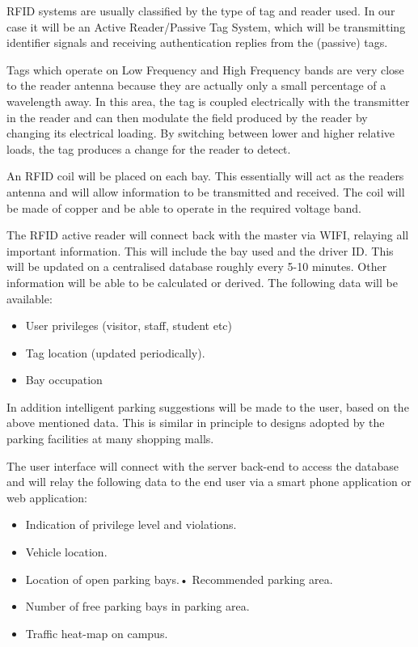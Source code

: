 RFID systems are usually classified by the type of tag and reader used. In our case it will be an Active
Reader/Passive Tag System, which will be transmitting identifier signals and receiving authentication
replies from the (passive) tags.

Tags which operate on Low Frequency and High Frequency bands are very close to the reader
antenna because they are actually only a small percentage of a wavelength away. In this area, the
tag is coupled electrically with the transmitter in the reader and can then modulate the field
produced by the reader by changing its electrical loading. By switching between lower and higher
relative loads, the tag produces a change for the reader to detect.

An RFID coil will be placed on each bay. This essentially will act as the readers antenna and will allow
information to be transmitted and received. The coil will be made of copper and be able to operate
in the required voltage band.

The RFID active reader will connect back with the master via WIFI, relaying all important
information. This will include the bay used and the driver ID. This will be updated on a centralised
database roughly every 5-10 minutes. Other information will be able to be calculated or derived. The
following data will be available:

\begin{itemize}
\item User privileges (visitor, staff, student etc)
\item Tag location (updated periodically).
\item Bay occupation
\end{itemize}

In addition intelligent parking suggestions will be made to the user, based on the above mentioned
data. This is similar in principle to designs adopted by the parking facilities at many shopping malls.

The user interface will connect with the server back-end to access the database and will relay the
following data to the end user via a smart phone application or web application:

\begin{itemize}
\item Indication of privilege level and violations.
\item Vehicle location.
\item Location of open parking bays.• Recommended parking area.
\item Number of free parking bays in parking area.
\item Traffic heat-map on campus.
\end{itemize}

